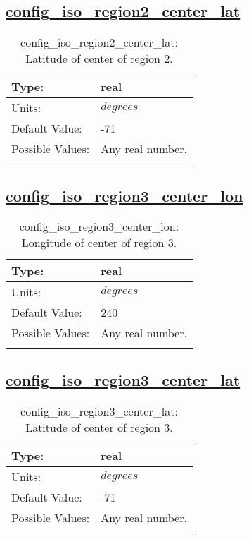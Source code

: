 \subsection[config\_iso\_region2\_center\_lat]{\hyperref[sec:nm_tab_iso]{config\_iso\_region2\_center\_lat}}
\label{subsec:nm_sec_config_iso_region2_center_lat}
\begin{center}
\begin{longtable}{| p{2.0in} || p{4.0in} |}
    \hline
    Type: & real \\
    \hline
    Units: & $degrees$ \\
    \hline
    Default Value: & -71 \\
    \hline
    Possible Values: & Any real number. \\
    \hline
    \caption{config\_iso\_region2\_center\_lat: Latitude of center of region 2.}
\end{longtable}
\end{center}
\subsection[config\_iso\_region3\_center\_lon]{\hyperref[sec:nm_tab_iso]{config\_iso\_region3\_center\_lon}}
\label{subsec:nm_sec_config_iso_region3_center_lon}
\begin{center}
\begin{longtable}{| p{2.0in} || p{4.0in} |}
    \hline
    Type: & real \\
    \hline
    Units: & $degrees$ \\
    \hline
    Default Value: & 240 \\
    \hline
    Possible Values: & Any real number. \\
    \hline
    \caption{config\_iso\_region3\_center\_lon: Longitude of center of region 3.}
\end{longtable}
\end{center}
\subsection[config\_iso\_region3\_center\_lat]{\hyperref[sec:nm_tab_iso]{config\_iso\_region3\_center\_lat}}
\label{subsec:nm_sec_config_iso_region3_center_lat}
\begin{center}
\begin{longtable}{| p{2.0in} || p{4.0in} |}
    \hline
    Type: & real \\
    \hline
    Units: & $degrees$ \\
    \hline
    Default Value: & -71 \\
    \hline
    Possible Values: & Any real number. \\
    \hline
    \caption{config\_iso\_region3\_center\_lat: Latitude of center of region 3.}
\end{longtable}
\end{center}
